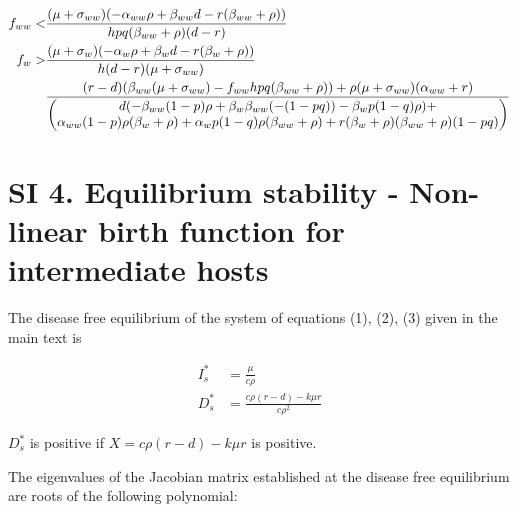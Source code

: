 \documentclass[11pt]{article}
\begin{document}
\begin{align}
	f_{ww} < &  \frac{(\mu + \sigma_{ww}) (-\alpha_{ww} \rho + \beta_{ww}d-r (\beta_{ww}+\rho ))}{h p q (\beta_{ww}+\rho ) (d-r)} \notag \\
	f_w > & \frac{(\mu + \sigma_w) (- \alpha_w \rho + \beta_w d-r (\beta_w+\rho ))}{h (d-r) (\mu + \sigma_{ww})}  \\
	          & \frac{(r-d) (\beta_{ww} (\mu + \sigma_{ww}) - f_{ww} h p q (\beta_{ww}+\rho ))+\rho  (\mu +\sigma_{ww}) (\alpha_{ww} + r)}{\begin{pmatrix}
	          		d (-\beta_{ww} (1-p) \rho +\beta_w \beta_{ww} (-(1-p q))-\beta_w p (1-q) \rho ) + \\
	          		\alpha_{ww} (1-p) \rho  (\beta_w+\rho )+\alpha_w p (1-q) \rho  (\beta_{ww}+\rho )+r (\beta_w+\rho ) (\beta_{ww}+\rho ) (1-p q)
	          	\end{pmatrix}}
\end{align}

\section*{SI 4. Equilibrium stability - Non-linear birth function for intermediate hosts }
The disease free equilibrium of the system of equations (1), (2), (3) given in the main text is

\begin{align}
	I_s^* & = \frac{\mu}{c \rho} \\
	D_s^* & = \frac{c \rho  (r-d)-k \mu  r}{c \rho^2}
\end{align}

$D_s^*$ is positive if $X = c \rho  (r-d)-k \mu  r$ is positive.

The eigenvalues of the Jacobian matrix established at the disease free equilibrium are roots of the following polynomial:
\end{document}
